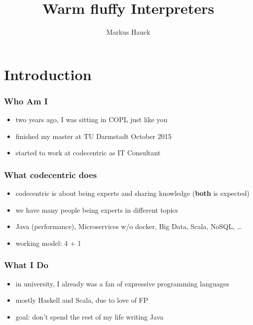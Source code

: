 \documentclass{beamer}
\author{Markus Hauck}
\institute{codecentric AG}
\title{Warm fluffy Interpreters}
\begin{document}
{
  \begin{frame}
    \titlepage{}
  \end{frame}
}

\begin{frame}
  \tableofcontents
\end{frame}

\section{Introduction}

\begin{frame}
  \frametitle{Who Am I}
  \begin{itemize}
  \item two years ago, I was sitting in COPL just like you
  \item finished my master at TU Darmstadt October 2015
  \item started to work at codecentric as IT Consultant
  \end{itemize}
\end{frame}

\begin{frame}
  \frametitle{What codecentric does}
  \begin{itemize}
  \item codecentric is about being experts and sharing knowledge (\textbf{both}
    is expected)
  \item we have many people being experts in different topics
  \item Java (performance), Microservices w/o docker, Big Data, Scala, NoSQL,
    \ldots
  \item working model: 4 + 1
  \end{itemize}
\end{frame}

\begin{frame}
  \frametitle{What I Do}
  \begin{itemize}
  \item in university, I already was a fan of expressive programming
    languages
  \item mostly Haskell and Scala, due to love of FP
  \item goal: don't spend the rest of my life writing Java
  \end{itemize}
\end{frame}
\end{document}
